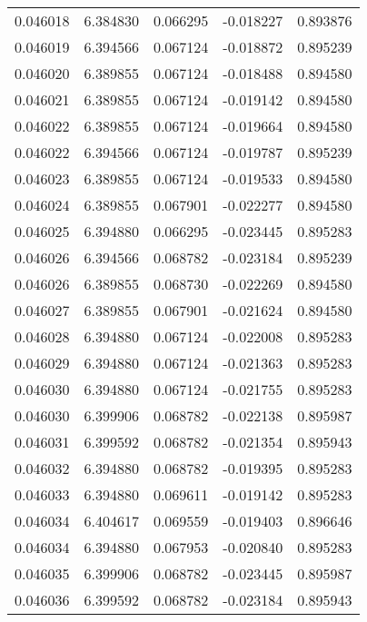 \begin{tabular}{lrrrr}
0.046018    &  6.384830 &  0.066295 & -0.018227 &             0.893876 \\
0.046019    &  6.394566 &  0.067124 & -0.018872 &             0.895239 \\
0.046020    &  6.389855 &  0.067124 & -0.018488 &             0.894580 \\
0.046021    &  6.389855 &  0.067124 & -0.019142 &             0.894580 \\
0.046022    &  6.389855 &  0.067124 & -0.019664 &             0.894580 \\
0.046022    &  6.394566 &  0.067124 & -0.019787 &             0.895239 \\
0.046023    &  6.389855 &  0.067124 & -0.019533 &             0.894580 \\
0.046024    &  6.389855 &  0.067901 & -0.022277 &             0.894580 \\
0.046025    &  6.394880 &  0.066295 & -0.023445 &             0.895283 \\
0.046026    &  6.394566 &  0.068782 & -0.023184 &             0.895239 \\
0.046026    &  6.389855 &  0.068730 & -0.022269 &             0.894580 \\
0.046027    &  6.389855 &  0.067901 & -0.021624 &             0.894580 \\
0.046028    &  6.394880 &  0.067124 & -0.022008 &             0.895283 \\
0.046029    &  6.394880 &  0.067124 & -0.021363 &             0.895283 \\
0.046030    &  6.394880 &  0.067124 & -0.021755 &             0.895283 \\
0.046030    &  6.399906 &  0.068782 & -0.022138 &             0.895987 \\
0.046031    &  6.399592 &  0.068782 & -0.021354 &             0.895943 \\
0.046032    &  6.394880 &  0.068782 & -0.019395 &             0.895283 \\
0.046033    &  6.394880 &  0.069611 & -0.019142 &             0.895283 \\
0.046034    &  6.404617 &  0.069559 & -0.019403 &             0.896646 \\
0.046034    &  6.394880 &  0.067953 & -0.020840 &             0.895283 \\
0.046035    &  6.399906 &  0.068782 & -0.023445 &             0.895987 \\
0.046036    &  6.399592 &  0.068782 & -0.023184 &             0.895943 \\

\end{tabular}
